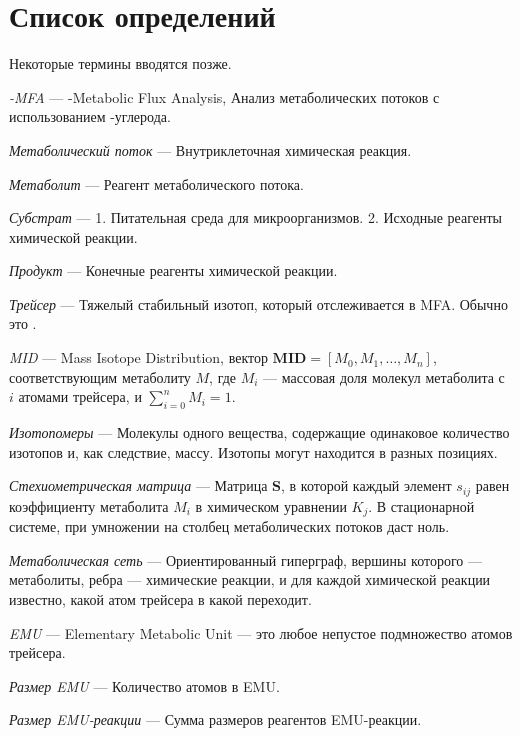 \documentclass[14pt, a4paper]{extreport}
\begin{document}
\section{Список определений}
Некоторые термины вводятся позже.

\hangindent=1cm \noindent
\emph{-MFA} --- -Metabolic Flux Analysis, Анализ метаболических потоков с использованием -углерода.

\hangindent=1cm \noindent
\emph{Метаболический поток} --- Внутриклеточная химическая реакция.

\hangindent=1cm \noindent
\emph{Метаболит} --- Реагент метаболического потока.

\hangindent=1cm \noindent
\emph{Субстрат} --- 1. Питательная среда для микроорганизмов. 2. Исходные реагенты химической реакции.

\hangindent=1cm \noindent
\emph{Продукт} --- Конечные реагенты химической реакции.

\hangindent=1cm \noindent
\emph{Трейсер} --- Тяжелый стабильный изотоп, который отслеживается в MFA. Обычно это .

\hangindent=1cm \noindent
\emph{MID} --- Mass Isotope Distribution, вектор $\mathbf{MID} = [M_0, M_1, \ldots, M_n]$, соответствующим метаболиту $M$, где $M_i$ --- массовая доля молекул метаболита с $i$ атомами трейсера, и $\sum_{i = 0}^{n} M_i = 1$.

\hangindent=1cm \noindent
\emph{Изотопомеры} --- Молекулы одного вещества, содержащие одинаковое количество изотопов и, как следствие, массу. Изотопы могут находится в разных позициях.

\hangindent=1cm \noindent
\emph{Стехиометрическая матрица} --- Матрица $\mathbf{S}$, в которой каждый элемент $s_{ij}$ равен коэффициенту метаболита $M_i$ в химическом уравнении $K_j$. В стационарной системе, при умножении на столбец метаболических потоков даст ноль.

\hangindent=1cm \noindent
\emph{Метаболическая сеть} --- Ориентированный гиперграф, вершины которого --- метаболиты, ребра --- химические реакции, и для каждой химической реакции известно, какой атом трейсера в какой переходит.

\hangindent=1cm \noindent
\emph{EMU} --- Elementary Metabolic Unit --- это любое непустое подмножество атомов трейсера.

\hangindent=1cm \noindent
\emph{Размер EMU} --- Количество атомов в EMU.

\hangindent=1cm \noindent
\emph{Размер EMU-реакции} --- Сумма размеров реагентов EMU-реакции.
\end{document}
